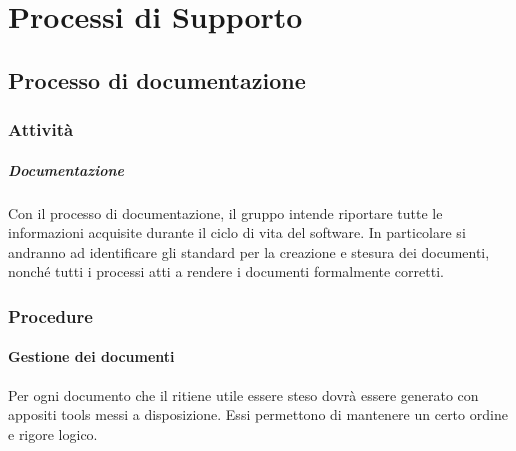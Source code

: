 %


\section{Processi di Supporto}

	\subsection{Processo di documentazione}
	
		\subsubsection{Attività}

			\subparagraph{Documentazione}
			Con il processo di documentazione, il gruppo \groupName{} intende riportare tutte le informazioni acquisite durante il ciclo di vita del software.
			In particolare si andranno ad identificare gli standard per la creazione e stesura dei documenti, nonché tutti i processi atti a rendere i documenti formalmente corretti.

		\subsubsection{Procedure}

			\paragraph{Gestione dei documenti}
			Per ogni documento che il \roleProjectManager{} ritiene utile essere steso dovrà essere generato con appositi tools messi a disposizione. Essi permettono di mantenere un certo ordine e rigore logico.  

